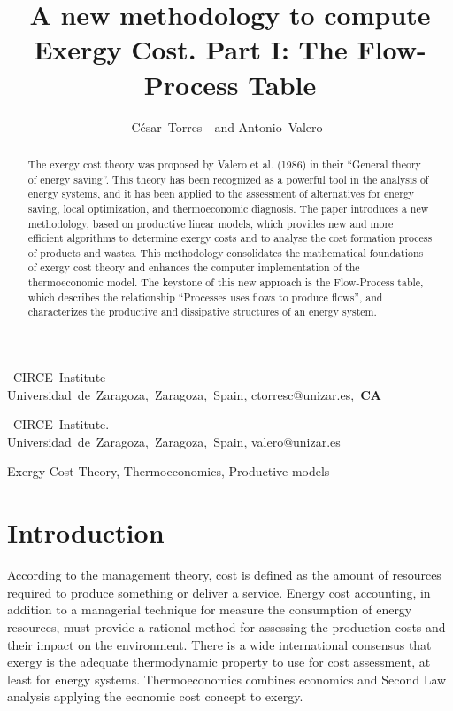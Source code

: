 \documentclass{ecos2018}
\title{A new methodology to compute Exergy Cost. Part I: The Flow-Process Table}
\author{%
      \mbox{C\'esar Torres \refauth{a}}~and
      \mbox{Antonio Valero \refauth{b}}}
\begin{document}
\maketitle

\begin{address}
 \mbox{ CIRCE Institute} \\
 \mbox{Universidad de Zaragoza, Zaragoza, Spain,}
 \mbox{ctorresc@unizar.es, \textbf{CA}} \par
 \mbox{ CIRCE Institute.} \\
 \mbox{Universidad de Zaragoza, Zaragoza, Spain,}
 \mbox{valero@unizar.es} \par
\end{address}

\begin{abstract}%
\begin{spacing}{1.1}
The exergy cost theory was proposed by Valero et al. (1986) in their “General theory of energy saving”. This theory has been recognized as a powerful tool in the analysis of energy systems, and it has been applied to the assessment of alternatives for energy saving, local optimization, and thermoeconomic diagnosis.
The paper introduces a new methodology, based on productive linear models, which provides new and more efficient algorithms to determine exergy costs and to analyse the cost formation process of products and wastes. This methodology consolidates the mathematical foundations of exergy cost theory and enhances the computer implementation of the thermoeconomic model.
The keystone of this new approach is the Flow-Process table, which describes the relationship “Processes uses flows to produce flows”, and characterizes the productive and dissipative structures of an energy system. 
\end{spacing}
\end{abstract}

\begin{keywords}
Exergy Cost Theory, Thermoeconomics, Productive models
\end{keywords}

\section{Introduction}
According to the management theory, cost is defined as the amount of resources required to produce something or deliver a service. Energy cost accounting, in addition to a managerial technique for measure the consumption of energy resources, must provide a rational method for assessing the production costs and their impact on the environment.
There is a wide international consensus that exergy is the adequate thermodynamic property to use for cost assessment, at least for energy systems. Thermoeconomics combines economics and Second Law analysis applying the economic cost concept to exergy.
\end{document}
